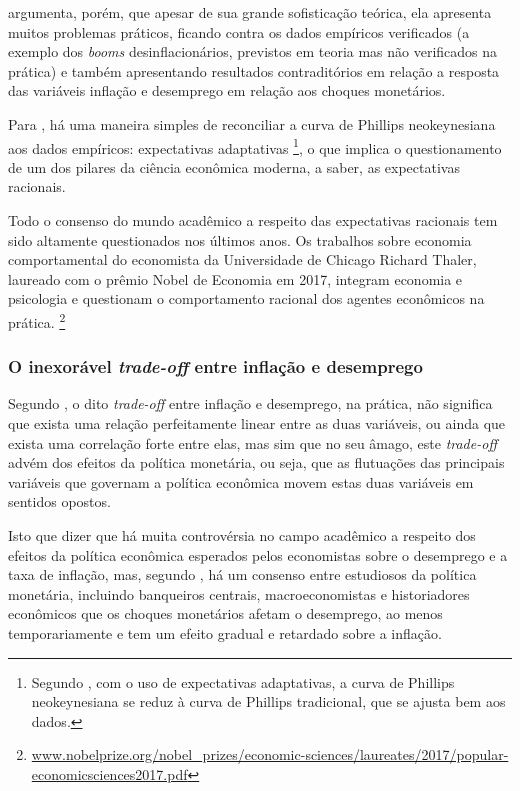 \documentclass[
	10pt,				%
	openright,			%
	twoside,			%
	a5paper,			%
	english,			%
	french,				%
	spanish,			%
	brazil				%
	]{abntex2}
\begin{document}
 argumenta, porém, que apesar de sua
grande sofisticação teórica, ela apresenta muitos problemas práticos,
ficando contra os dados empíricos verificados (a exemplo dos
\emph{booms} desinflacionários, previstos em teoria mas não verificados
na prática) e também apresentando resultados contraditórios em relação a
resposta das variáveis inflação e desemprego em relação aos choques
monetários.

Para , há uma maneira simples de
reconciliar a curva de Phillips neokeynesiana aos dados empíricos:
expectativas adaptativas \footnote{Segundo
  , com o uso de expectativas adaptativas,
  a curva de Phillips neokeynesiana se reduz à curva de Phillips
  tradicional, que se ajusta bem aos dados.}, o que implica o
questionamento de um dos pilares da ciência econômica moderna, a saber,
as expectativas racionais.

Todo o consenso do mundo acadêmico a respeito das expectativas racionais
tem sido altamente questionados nos últimos anos. Os trabalhos sobre
economia comportamental do economista da Universidade de Chicago Richard
Thaler, laureado com o prêmio Nobel de Economia em 2017, integram
economia e psicologia e questionam o comportamento racional dos agentes
econômicos na prática. \footnote{\href{https://www.nobelprize.org/nobel_prizes/economic-sciences/laureates/2017/popular-economicsciences2017.pdf}{www.nobelprize.org/nobel\_prizes/economic-sciences/laureates/2017/popular-economicsciences2017.pdf}}

\subsubsection{\texorpdfstring{O inexorável \emph{trade-off} entre
inflação e
desemprego}{O inexorável trade-off entre inflação e desemprego}}\label{o-inexoruxe1vel-trade-off-entre-inflauxe7uxe3o-e-desemprego}

Segundo , o dito \emph{trade-off} entre
inflação e desemprego, na prática, não significa que exista uma relação
perfeitamente linear entre as duas variáveis, ou ainda que exista uma
correlação forte entre elas, mas sim que no seu âmago, este
\emph{trade-off} advém dos efeitos da política monetária, ou seja, que
as flutuações das principais variáveis que governam a política econômica
movem estas duas variáveis em sentidos opostos.

Isto que dizer que há muita controvérsia no campo acadêmico a respeito
dos efeitos da política econômica esperados pelos economistas sobre o
desemprego e a taxa de inflação, mas, segundo
, há um consenso entre estudiosos da
política monetária, incluindo banqueiros centrais, macroeconomistas e
historiadores econômicos que os choques monetários afetam o desemprego,
ao menos temporariamente e tem um efeito gradual e retardado sobre a
inflação.
\end{document}
